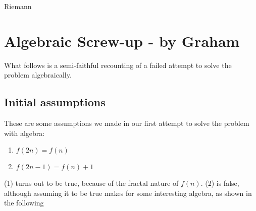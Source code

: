 \documentclass{article}
\begin{document}

Riemann

\section{Algebraic Screw-up - by Graham}
What follows is a semi-faithful recounting of a failed attempt to solve the problem algebraically.
\subsection{Initial assumptions}
These are some assumptions we made in our first attempt to solve the problem with algebra:
\begin{enumerate}
    \item $f(2n) = f(n)$
    \item $f(2n-1) = f(n) + 1$
\end{enumerate}

(1) turns out to be true, because of the fractal nature of $f(n)$.
(2) is false, although assuming it to be true makes for some interesting algebra, as shown in the following\\
\end{document}
